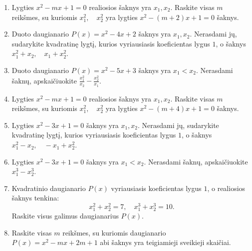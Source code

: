 \documentclass[11pt,a4paper]{article}
\begin{document}
\begin{enumerate}
\item \begin{minipage}[t]{\linewidth}Lygties \(x^{2}-mx+1=0\) realiosios šaknys yra \(x_1,x_2\). Raskite visas \(m\) reikšmes, su kuriomis \mbox{\(x_1^2,\quad x_2^2\)} yra lygties \(x^{2}-\left(m + 2\right)x+1=0\) šaknys.\end{minipage}
\item \begin{minipage}[t]{\linewidth}Duoto daugianario \(P(x)=x^{2}-4x+2\) šaknys yra \(x_1,x_2\). Nerasdami jų, sudarykite kvadratinę lygtį, kurios vyriausiasis koeficientas lygus \(1\), o šaknys \mbox{\(x_{1}^{2} + x_{2},\quad x_{1} + x_{2}^{2}\)}.\end{minipage}
\item \begin{minipage}[t]{\linewidth}Duoto daugianario \(P(x)=x^{2}-5x+3\) šaknys yra \(x_1<x_2\). Nerasdami šaknų, apskaičiuokite \mbox{\(\frac{x_{1}^{2}}{x_{2}} - \frac{x_{2}^{2}}{x_{1}}\)}.\end{minipage}
\item \begin{minipage}[t]{\linewidth}Lygties \(x^{2}-mx+1=0\) realiosios šaknys yra \(x_1,x_2\). Raskite visas \(m\) reikšmes, su kuriomis \mbox{\(x_1^2,\quad x_2^2\)} yra lygties \(x^{2}-\left(m + 4\right)x+1=0\) šaknys.\end{minipage}
\item \begin{minipage}[t]{\linewidth}Lygties \(x^{2}-3x+1=0\) šaknys yra \(x_1,x_2\). Nerasdami jų, sudarykite kvadratinę lygtį, kurios vyriausiasis koeficientas lygus \(1\), o šaknys \mbox{\(x_{1}^{2} - x_{2},\quad - x_{1} + x_{2}^{2}\)}.\end{minipage}
\item \begin{minipage}[t]{\linewidth}Lygties \(x^{2}-3x+1=0\) šaknys yra \(x_1<x_2\). Nerasdami šaknų, apskaičiuokite \mbox{\(x_{1}^{3} - x_{2}^{3}\)}.\end{minipage}
\item \begin{minipage}[t]{\linewidth}Kvadratinio daugianario \(P(x)\) vyriausiasis koeficientas lygus \(1\), o realiosios šaknys tenkina: \[x_1^2+x_2^2=7,\quad x_1^3+x_2^3=10.\] Raskite visus galimus daugianarius \(P(x)\).\end{minipage}
\item \begin{minipage}[t]{\linewidth}Raskite visas \(m\) reikšmes, su kuriomis daugianario \(P(x)=x^{2}-mx+2 m + 1\) abi šaknys yra teigiamieji sveikieji skaičiai.\end{minipage}

\end{enumerate}
\end{document}
